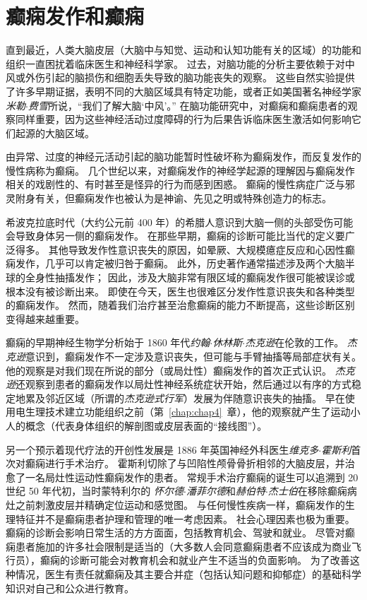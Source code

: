 \chapter{癫痫发作和癫痫} \label{chap:chap58}

直到最近，人类大脑皮层（大脑中与知觉、运动和认知功能有关的区域）的功能和组织一直困扰着临床医生和神经科学家。
过去，对脑功能的分析主要依赖于对中风或外伤引起的脑损伤和细胞丢失导致的脑功能丧失的观察。
这些自然实验提供了许多早期证据，表明不同的大脑区域具有特定功能，或者正如美国著名神经学家\textit{米勒$\cdot$费雪}所说，“我们了解大脑‘中风’。”
在脑功能研究中，对癫痫和癫痫患者的观察同样重要，因为这些神经活动过度障碍的行为后果告诉临床医生激活如何影响它们起源的大脑区域。


由异常、过度的神经元活动引起的脑功能暂时性破坏称为癫痫发作，而反复发作的慢性病称为癫痫。
几个世纪以来，对癫痫发作的神经学起源的理解因与癫痫发作相关的戏剧性的、有时甚至是怪异的行为而感到困惑。
癫痫的慢性病症广泛与邪灵附身有关，但癫痫发作也被认为是神谕、先见之明或特殊创造力的标志。


希波克拉底时代（大约公元前 400 年）的希腊人意识到大脑一侧的头部受伤可能会导致身体另一侧的癫痫发作。
在那些早期，癫痫的诊断可能比当代的定义要广泛得多。
其他导致发作性意识丧失的原因，如晕厥、大规模癔症反应和心因性癫痫发作，几乎可以肯定被归咎于癫痫。
此外，历史著作通常描述涉及两个大脑半球的全身性抽搐发作；
因此，涉及大脑非常有限区域的癫痫发作很可能被误诊或根本没有被诊断出来。
即使在今天，医生也很难区分发作性意识丧失和各种类型的癫痫发作。
然而，随着我们治疗甚至治愈癫痫的能力不断提高，这些诊断区别变得越来越重要。


癫痫的早期神经生物学分析始于 1860 年代\textit{约翰$\cdot$休林斯$\cdot$杰克逊}在伦敦的工作。
\textit{杰克逊}意识到，癫痫发作不一定涉及意识丧失，但可能与手臂抽搐等局部症状有关。
他的观察是对我们现在所说的部分（或局灶性）癫痫发作的首次正式认识。
\textit{杰克逊}还观察到患者的癫痫发作以局灶性神经系统症状开始，然后通过以有序的方式稳定地累及邻近区域（所谓的\textit{杰克逊式行军}）发展为伴随意识丧失的抽搐。
早在使用电生理技术建立功能组织之前（第~\ref{chap:chap4}~章），他的观察就产生了运动小人的概念（代表身体组织的解剖图或皮层表面的“接线图”）。


另一个预示着现代疗法的开创性发展是 1886 年英国神经外科医生\textit{维克多$\cdot$霍斯利}首次对癫痫进行手术治疗。
霍斯利切除了与凹陷性颅骨骨折相邻的大脑皮层，并治愈了一名局灶性运动性癫痫发作的患者。
常规手术治疗癫痫的诞生可以追溯到 20 世纪 50 年代初，当时蒙特利尔的 \textit{怀尔德$\cdot$潘菲尔德}和\textit{赫伯特$\cdot$杰士伯}在移除癫痫病灶之前刺激皮层并精确定位运动和感觉图。
与任何慢性疾病一样，癫痫发作的生理特征并不是癫痫患者护理和管理的唯一考虑因素。
社会心理因素也极为重要。
癫痫的诊断会影响日常生活的方方面面，包括教育机会、驾驶和就业。
尽管对癫痫患者施加的许多社会限制是适当的（大多数人会同意癫痫患者不应该成为商业飞行员），癫痫的诊断可能会对教育机会和就业产生不适当的负面影响。
为了改善这种情况，医生有责任就癫痫及其主要合并症（包括认知问题和抑郁症）的基础科学知识对自己和公众进行教育。



